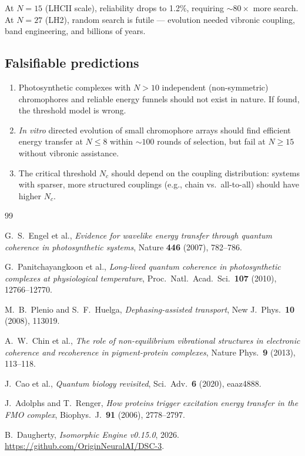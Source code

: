 \documentclass[11pt]{amsart}
\theoremstyle{definition}
\begin{document}
At $N = 15$ (LHCII scale), reliability drops to 1.2\%, requiring $\sim 80\times$ more search. At $N = 27$ (LH2), random search is futile --- evolution needed vibronic coupling, band engineering, and billions of years.

\subsection{Falsifiable predictions}

\begin{enumerate}[label=\textbf{P\arabic*.}]
\item Photosynthetic complexes with $N > 10$ independent (non-symmetric) chromophores and reliable energy funnels should not exist in nature. If found, the threshold model is wrong.
\item \emph{In vitro} directed evolution of small chromophore arrays should find efficient energy transfer at $N \leq 8$ within $\sim 100$ rounds of selection, but fail at $N \geq 15$ without vibronic assistance.
\item The critical threshold $N_c$ should depend on the coupling distribution: systems with sparser, more structured couplings (e.g., chain vs.\ all-to-all) should have higher $N_c$.
\end{enumerate}

\begin{thebibliography}{99}

G.~S.~Engel et al., \emph{Evidence for wavelike energy transfer through quantum coherence in photosynthetic systems}, Nature \textbf{446} (2007), 782--786.

G.~Panitchayangkoon et al., \emph{Long-lived quantum coherence in photosynthetic complexes at physiological temperature}, Proc.\ Natl.\ Acad.\ Sci.\ \textbf{107} (2010), 12766--12770.

M.~B.~Plenio and S.~F.~Huelga, \emph{Dephasing-assisted transport}, New J.\ Phys.\ \textbf{10} (2008), 113019.

A.~W.~Chin et al., \emph{The role of non-equilibrium vibrational structures in electronic coherence and recoherence in pigment-protein complexes}, Nature Phys.\ \textbf{9} (2013), 113--118.

J.~Cao et al., \emph{Quantum biology revisited}, Sci.\ Adv.\ \textbf{6} (2020), eaaz4888.

J.~Adolphs and T.~Renger, \emph{How proteins trigger excitation energy transfer in the FMO complex}, Biophys.\ J.\ \textbf{91} (2006), 2778--2797.

B.~Daugherty, \emph{Isomorphic Engine v0.15.0}, 2026. \url{https://github.com/OriginNeuralAI/DSC-3}.

\end{thebibliography}
\end{document}
